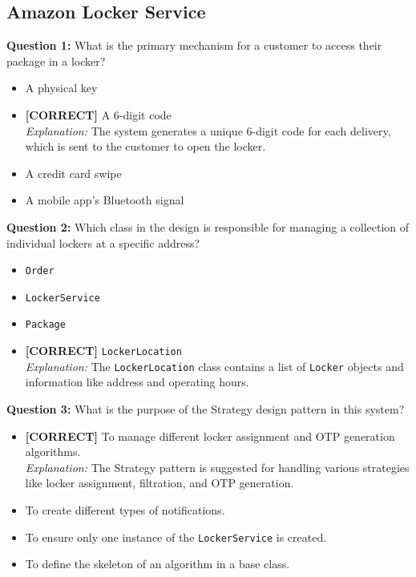 \subsection*{Amazon Locker Service}
\vspace{0.3cm}
\noindent
\textbf{Question 1:} What is the primary mechanism for a customer to access their package in a locker?
\\[0.2cm]
\begin{itemize}
 \item A physical key
 \item \textbf{[CORRECT]} A 6-digit code
\\[0.1cm]
\textit{Explanation:} 
The system generates a unique 6-digit code for each delivery, which is sent to the customer to open the locker.
 \item A credit card swipe
 \item A mobile app's Bluetooth signal
\end{itemize}
\vspace{0.3cm}
\noindent
\textbf{Question 2:} Which class in the design is responsible for managing a collection of individual lockers at a specific address?
\\[0.2cm]
\begin{itemize}
 \item \texttt{Order}
 \item \texttt{LockerService}
 \item \texttt{Package}
 \item \textbf{[CORRECT]} \texttt{LockerLocation}
\\[0.1cm]
\textit{Explanation:} 
The \texttt{LockerLocation} class contains a list of \texttt{Locker} objects and information like address and operating hours.
\end{itemize}
\vspace{0.3cm}
\noindent
\textbf{Question 3:} What is the purpose of the Strategy design pattern in this system?
\\[0.2cm]
\begin{itemize}
 \item \textbf{[CORRECT]} To manage different locker assignment and OTP generation algorithms.
\\[0.1cm]
\textit{Explanation:} 
The Strategy pattern is suggested for handling various strategies like locker assignment, filtration, and OTP generation.
 \item To create different types of notifications.
 \item To ensure only one instance of the \texttt{LockerService} is created.
 \item To define the skeleton of an algorithm in a base class.
\end{itemize}
